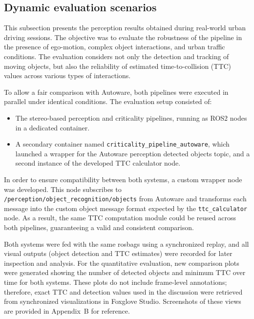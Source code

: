 \subsection{Dynamic evaluation scenarios}

This subsection presents the perception results obtained during real-world 
urban driving sessions. The objective was to evaluate the robustness of the 
pipeline in the presence of ego-motion, complex object interactions, and 
urban traffic conditions. The evaluation considers not only the detection 
and tracking of moving objects, but also the reliability of estimated 
time-to-collision (TTC) values across various types of interactions.

To allow a fair comparison with Autoware, both pipelines were executed 
in parallel under identical conditions. The evaluation setup consisted of:

\begin{itemize}
  \item The stereo-based perception and criticality pipelines, running 
        as ROS2 nodes in a dedicated container.
  \item A secondary container named \texttt{criticality\_pipeline\_autoware}, 
        which launched a wrapper for the Autoware perception detected 
        objects topic, and a second instance of the developed TTC 
        calculator node.
\end{itemize}

In order to ensure compatibility between both systems, a custom wrapper 
node was developed. This node subscribes to 
\texttt{/perception/object\_recognition/objects} from Autoware and 
transforms each message into the custom object message format expected 
by the \texttt{ttc\_calculator} node. As a result, the same TTC computation 
module could be reused across both pipelines, guaranteeing a valid and 
consistent comparison.

Both systems were fed with the same rosbags using a synchronized replay, 
and all visual outputs (object detection and TTC estimates) were recorded 
for later inspection and analysis. For the quantitative evaluation, new 
comparison plots were generated showing the number of detected objects 
and minimum TTC over time for both systems. These plots do not include 
frame-level annotations; therefore, exact TTC and detection values used in 
the discussion were retrieved from synchronized visualizations in 
Foxglove Studio. Screenshots of these views are provided in Appendix~B 
for reference.


